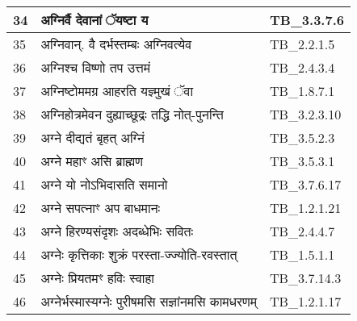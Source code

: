 \documentclass[17pt]{extarticle}
\begin{document}
\begin{longtable}{||p{0.4in}||p{4.9in}||p{0.9in}||}
    \hline
        
    34 & अग्निर्वै देवानां ॅयष्टा य & TB\_3.3.7.6       \\
    
    \hline
        
    35 & अग्निवान्. वै दर्भस्तम्बः अग्निवत्येव & TB\_2.2.1.5       \\
    
    \hline
        
    36 & अग्निश्च विष्णो तप उत्तमं & TB\_2.4.3.4       \\
    
    \hline
        
    37 & अग्निष्टोममग्र आहरति यज्ञ्मुखं ॅवा & TB\_1.8.7.1       \\
    
    \hline
        
    38 & अग्निहोत्रमेवन दुह्याच्छूद्रः तद्धि नोत्{-}पुनन्ति & TB\_3.2.3.10       \\
    
    \hline
        
    39 & अग्ने दीद्यतं बृहत् अग्निं & TB\_3.5.2.3       \\
    
    \hline
        
    40 & अग्ने महाꣳ असि ब्राह्मण & TB\_3.5.3.1       \\
    
    \hline
        
    41 & अग्ने यो नोऽभिदासति समानो & TB\_3.7.6.17       \\
    
    \hline
        
    42 & अग्ने सपत्नाꣳ अप बाधमानः & TB\_1.2.1.21       \\
    
    \hline
        
    43 & अग्ने हिरण्यसंदृशः अदब्धेभिः सवितः & TB\_2.4.4.7       \\
    
    \hline
        
    44 & अग्नेः कृत्तिकाः शुक्रं परस्ता{-}ज्ज्योति{-}रवस्तात् & TB\_1.5.1.1       \\
    
    \hline
        
    45 & अग्नेः प्रियतमꣳ हविः स्वाहा & TB\_3.7.14.3       \\
    
    \hline
        
    46 & अग्नेर्भस्मास्यग्नेः पुरीषमसि सज्ञांनमसि कामधरणम् & TB\_1.2.1.17       \\
    

\end{longtable}
\end{document}
